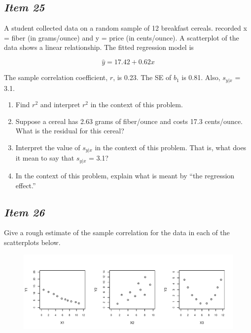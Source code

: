 \subsection{\textbf{\textit{Item 25}}}
A student collected data on a random sample of 12 breakfast cereals.   recorded x = fiber (in grams/ounce) and y = price (in cents/ounce).  A scatterplot of the data shows a linear relationship.  The fitted regression model is

\begin{equation*}
\hat{y} = 17.42 + 0.62x
\end{equation*}
  
The sample correlation coefficient, $r$, is 0.23.  The SE of $b_1$ is 0.81.   Also, $s_{y|x}$ = 3.1.
\begin{enumerate}[leftmargin=1cm, itemsep=.2em]
\item Find $r^2$ and interpret $r^2$ in the context of this problem.
\item Suppose a cereal has 2.63 grams of fiber/ounce and costs 17.3 cents/ounce.  What is the residual for this cereal?
\item Interpret the value of $s_{y|x}$ in the context of this problem.  That is, what does it mean to say that $s_{y|x}$ = 3.1?
\item In the context of this problem, explain what is meant by ``the regression effect.''
\end{enumerate}

\subsection{\textbf{\textit{Item 26}}}
Give a rough estimate of the sample correlation for the data in each of the scatterplots below.

\begin{figure}[ht]
\centering
\includegraphics[width=6.5in]{includes/Item19_R.pdf}
\end{figure}


